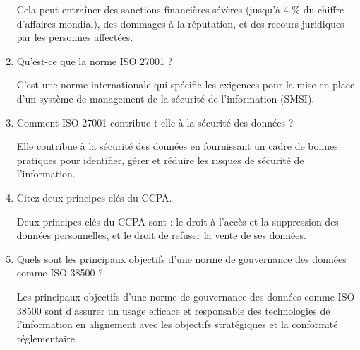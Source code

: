 \begin{enumerate}
        Cela peut entraîner des sanctions financières sévères (jusqu'à 4 \% du chiffre d'affaires mondial), des dommages à la réputation, et des recours juridiques par les personnes affectées.
    \item Qu’est-ce que la norme ISO 27001 ?

        C'est une norme internationale qui spécifie les exigences pour la mise en place d'un système de management de la sécurité de l'information (SMSI).
    \item Comment ISO 27001 contribue-t-elle à la sécurité des données ?

        Elle contribue à la sécurité des données en fournissant un cadre de bonnes pratiques pour identifier, gérer et réduire les risques de sécurité de l'information.
    \item Citez deux principes clés du CCPA.

        Deux principes clés du CCPA sont : le droit à l'accès et la suppression des données personnelles, et le droit de refuser la vente de ses données.
    \item Quels sont les principaux objectifs d'une norme de gouvernance des données comme ISO 38500 ?

        Les principaux objectifs d'une norme de gouvernance des données comme ISO 38500 sont d'assurer un usage efficace et responsable des technologies de l'information en alignement avec les objectifs stratégiques et la conformité réglementaire.
\end{enumerate}
